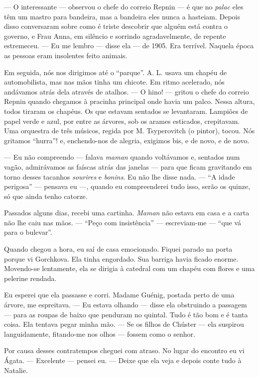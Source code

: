 --- O interessante --- observou o chefe do correio Repnin --- é que no
\emph{palac} eles têm um mastro para bandeira, mas a bandeira eles nunca
a hasteiam. Depois disso conversaram sobre como é triste descobrir que
alguém está contra o governo, e Frau Anna, em silêncio e sorrindo
agradavelmente, de repente estremeceu. --- Eu me lembro --- disse ela
--- de 1905. Era terrível. Naquela época as pessoas eram insolentes
feito animais.

Em seguida, nós nos dirigimos até o ``parque''. A. L. usava um chapéu de
automobilista, mas nas mãos tinha um chicote. Em ritmo acelerado, nós
andávamos atrás dela através de atalhos. --- O hino! --- gritou o chefe
do correio Repnin quando chegamos à pracinha principal onde havia um
palco. Nessa altura, todos tiraram os chapéus. Os que estavam sentados
se levantaram. Lampiões de papel verde e azul, por entre as árvores, sob
os arames esticados, crepitavam. Uma orquestra de três músicos, regida
por M. Tsyperovitch (o pintor), tocou. Nós gritamos ``hurra''! e,
enchendo-nos de alegria, exigimos bis, e de novo, e de novo.

--- Eu não compreendo --- falava \emph{maman} quando voltávamos e,
sentados num vagão, admirávamos as faíscas atrás das janelas --- para
que ficam gravitando em torno desses tacanhos \emph{sourires} e
\emph{bonins}. Eu não lhe disse nada. --- ``A idade perigosa'' ---
pensava eu ---, quando eu compreenderei tudo isso, serão os quinze, só
que ainda tenho catorze.

Passados alguns dias, recebi uma cartinha. \emph{Maman} não estava em
casa e a carta não lhe caiu nas mãos. --- ``Peço com insistência'' ---
escreviam-me --- ``que vá para o bulevar''.

Quando chegou a hora, eu saí de casa emocionado. Fiquei parado na porta
porque vi Gorchkova. Ela tinha engordado. Sua barriga havia ficado
enorme. Movendo-se lentamente, ela se dirigia à catedral com um chapéu
com flores e uma pelerine rendada.

Eu esperei que ela passasse e corri. Madame Guénig, postada perto de uma
árvore, me espreitava. --- Eu estava olhando --- disse ela obstruindo a
passagem --- para as roupas de baixo que penduram no quintal. Tudo é tão
bom e é tanta coisa. Ela tentava pegar minha mão. --- Se os filhos de
Chúster --- ela suspirou languidamente, fitando-me nos olhos --- fossem
como o senhor.

Por causa desses contratempos cheguei com atraso. No lugar do encontro
eu vi Ágata. --- Excelente --- pensei eu. --- Deixe que ela veja e
depois conte tudo à Natalie.

